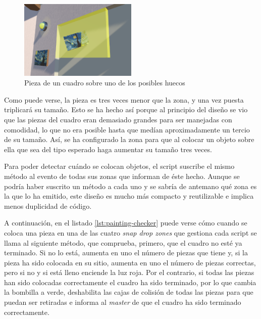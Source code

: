\begin{figure}[!h]
\begin{center}
\includegraphics[width=0.5\textwidth]{imagenes/7/painting-piece-hover.png}
\caption{Pieza de un cuadro sobre uno de los posibles huecos}
\label{fig:painting-piece-hover}
\end{center}
\vspace{-0.5cm}
\end{figure}

Como puede verse, la pieza es tres veces menor que la zona, y una vez puesta triplicará su tamaño. Esto se ha hecho así porque al principio del diseño se vio que las piezas del cuadro eran demasiado grandes para ser manejadas con comodidad, lo que no era posible hasta que medían aproximadamente un tercio de su tamaño. Así, se ha configurado la zona para que al colocar un objeto sobre ella que sea del tipo esperado haga aumentar su tamaño tres veces.

Para poder detectar cuándo se colocan objetos, el script suscribe el mismo método al evento de todas sus zonas que informan de éste hecho. Aunque se podría haber suscrito un método a cada uno y se sabría de antemano qué zona es la que lo ha emitido, este diseño es mucho más compacto y reutilizable e implica menos duplicidad de código.

A continuación, en el listado \ref{lst:painting-checker} puede verse cómo cuando se coloca una pieza en una de las cuatro \textit{snap drop zones} que gestiona cada script se llama al siguiente método, que comprueba, primero, que el cuadro no esté ya terminado. Si no lo está, aumenta en uno el número de piezas que tiene y, si la pieza ha sido colocada en su sitio, aumenta en uno el número de piezas correctas, pero si no y si está lleno enciende la luz roja. Por el contrario, si todas las piezas han sido colocadas correctamente el cuadro ha sido terminado, por lo que cambia la bombilla a verde, deshabilita las cajas de colisión de todas las piezas para que puedan ser retiradas e informa al \textit{master} de que el cuadro ha sido terminado correctamente.

